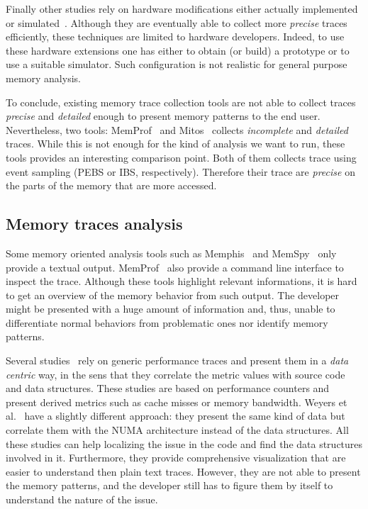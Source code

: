 Finally other studies rely on hardware modifications either actually implemented or simulated~\cite{Bao08HMTT,Martonosi92MemSpy}.
Although they are eventually able to collect more \emph{precise} traces efficiently, these techniques are limited to hardware developers.
Indeed, to use these hardware extensions one has either to obtain (or build) a prototype or to use a suitable simulator.
Such configuration is not realistic for general purpose memory analysis.

To conclude, existing memory trace collection tools are not able to collect traces \emph{precise} and \emph{detailed} enough to present memory patterns to the end user.
Nevertheless, two tools: \gls{MemProf}~\cite{Lachaize12MemProf} and \gls{Mitos}~\cite{Gimenez14Dissecting} collects \emph{incomplete} and \emph{detailed} traces.
While this is not enough for the kind of analysis we want to run, these tools provides an interesting comparison point.
Both of them collects trace using event sampling (\gls{PEBS} or \gls{IBS}, respectively).
Therefore their trace are \emph{precise} on the parts of the memory that are more accessed.

\subsection{Memory traces analysis}

Some memory oriented analysis tools such as \gls{Memphis}~\cite{McCurdy10Memphis} and \gls{MemSpy}~\cite{Martonosi92MemSpy} only provide a textual output.
\gls{MemProf}~\cite{Lachaize12MemProf} also provide a command line interface to inspect the trace.
Although these tools highlight relevant informations, it is hard to get an overview of the memory behavior from such output.
The developer might be presented with a huge amount of information and, thus, unable to differentiate normal behaviors from problematic ones nor identify memory patterns.

Several studies~\cite{DeRose01Hardware,DeRose02SIGMA,Bosch00Rivet} rely on generic performance traces and present them in a \emph{data centric} way, in the sens that they correlate the metric values with source code and data structures.
These studies are based on performance counters and present derived metrics such as cache misses or memory bandwidth.
Weyers et al.~\cite{Weyers14Visualization} have a slightly different approach: they present the same kind of data but correlate them with the \gls{NUMA} architecture instead of the data structures.
All these studies can help localizing the issue in the code and find the data structures involved in it.
Furthermore, they provide comprehensive visualization that are easier to understand then plain text traces.
However, they are not able to present the memory patterns, and the developer still has to figure them by itself to understand the nature of the issue.

